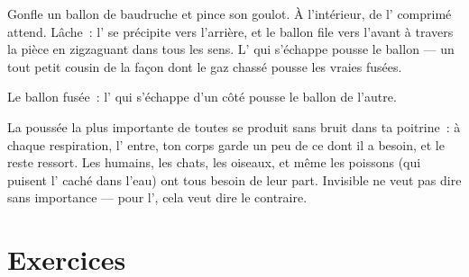 \begin{example}\label{ex:g2:air-around-us:balloon}
Gonfle un ballon de baudruche et pince son goulot. À l'intérieur, de
l' comprimé attend. Lâche~: l' se précipite vers l'arrière, et
le ballon file vers l'avant à travers la pièce en zigzaguant dans
tous les sens. L' qui s'échappe pousse le ballon --- un tout petit
cousin de la façon dont le gaz chassé pousse les vraies fusées.
\end{example}

\begin{omfigure}

{\small Le ballon fusée~: l' qui s'échappe d'un côté pousse le
ballon de l'autre.}
\end{omfigure}

\begin{remark}\label{rem:g2:air-around-us:breathe}
La poussée la plus importante de toutes se produit sans bruit dans ta
poitrine~: à chaque respiration, l' entre, ton corps garde un peu
de ce dont il a besoin, et le reste ressort. Les humains, les chats,
les oiseaux, et même les poissons (qui puisent l' caché dans
l'eau) ont tous besoin de leur part. Invisible ne veut pas dire sans
importance --- pour l', cela veut dire le contraire.
\end{remark}

\section{Exercices}

